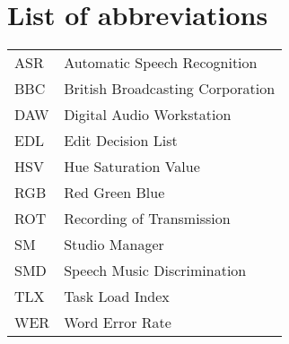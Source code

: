 \chapter*{List of abbreviations}

\begin{tabular}{l l}
ASR & Automatic Speech Recognition \\
BBC & British Broadcasting Corporation \\
DAW & Digital Audio Workstation \\
EDL & Edit Decision List \\
HSV & Hue Saturation Value \\
RGB & Red Green Blue \\
ROT & Recording of Transmission \\
SM  & Studio Manager \\
SMD & Speech Music Discrimination \\
TLX & Task Load Index \\
WER & Word Error Rate
\end{tabular}
